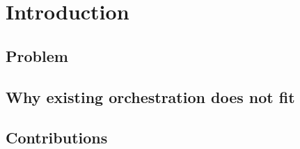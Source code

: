 \section{Introduction}
\label{sec:intro}


\subsection{Problem}

\subsection{Why existing orchestration does not fit}

\subsection{Contributions}


